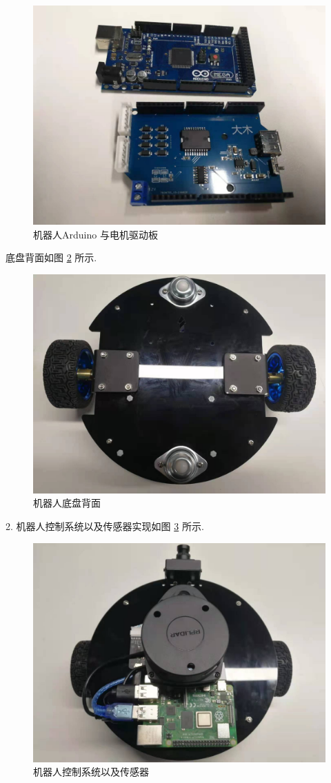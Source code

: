 \documentclass[openany, fontset=windowsold]{ctexbook}
\theoremstyle{kaiti}
\theoremstyle{normal}
\begin{document}
\begin{figure}[!ht]
  \centering
  \includegraphics[width=.5\textwidth]{robot_arduino_board.jpg}
  \caption{机器人Arduino 与电机驱动板}
  \label{fig:robot_arduino_board}
\end{figure}

底盘背面如图 \ref{fig:robot_chassis_back} 所示.

\begin{figure}[!ht]
  \centering
  \includegraphics[width=.5\textwidth]{robot_chassis_back.jpg}
  \caption{机器人底盘背面}
  \label{fig:robot_chassis_back}
\end{figure}

2. 机器人控制系统以及传感器实现如图 \ref{fig:robot_sense_control} 所示.

\begin{figure}[!ht]
  \centering
  \includegraphics[width=.5\textwidth]{robot_sense_control.jpg}
  \caption{机器人控制系统以及传感器}
  \label{fig:robot_sense_control}
\end{figure}
\end{document}
